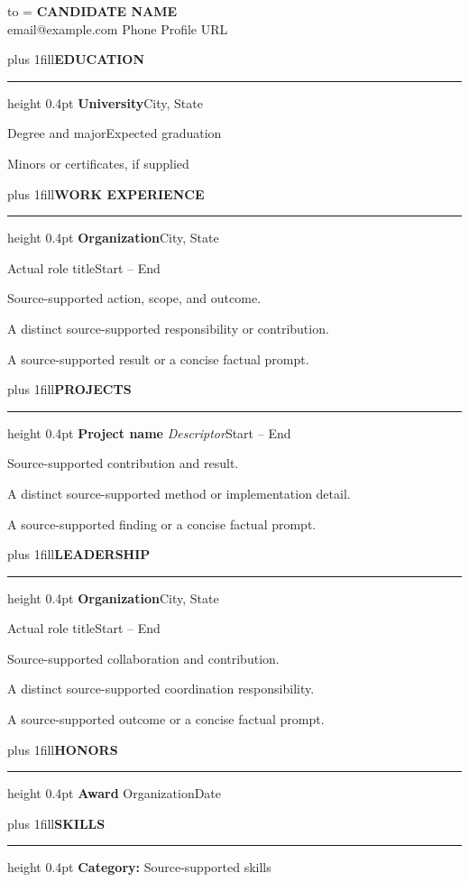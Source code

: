 \documentclass[10pt,letterpaper]{article}
\renewenvironment{itemize}{\begin{list}{\textbullet}{\setlength{\leftmargin}{1.1em}\setlength{\itemsep}{0.5pt}\setlength{\parsep}{0pt}\setlength{\topsep}{2pt}\setlength{\partopsep}{0pt}}}{\end{list}}
\newcommand{\resumeSection}[1]{\par\vskip 4pt plus 1fill\noindent\textbf{\MakeUppercase{#1}}\par\nobreak\vspace{1pt}\hrule height 0.4pt\nobreak\vspace{3pt}}
\newcommand{\resumeEntryGap}{\par\vspace{6pt}}
\newcommand{\resumeRow}[2]{\noindent #1\hfill #2\par}
\begin{document}
\noindent\vbox to \textheight\bgroup
\hsize=\textwidth
\begingroup\centering
{\fontsize{18}{20}\selectfont\bfseries CANDIDATE NAME}\\[2pt]
email@example.com \enspace\textbullet\enspace Phone \enspace\textbullet\enspace Profile URL
\par\endgroup
\vspace{4pt}

\resumeSection{Education}
\resumeRow{\textbf{University}}{City, State}
\resumeRow{Degree and major}{Expected graduation}
Minors or certificates, if supplied

\resumeSection{Work Experience}
\resumeRow{\textbf{Organization}}{City, State}
\resumeRow{\textnormal{Actual role title}}{Start -- End}
\begin{itemize}
\item Source-supported action, scope, and outcome.
\item A distinct source-supported responsibility or contribution.
\item A source-supported result or a concise factual prompt.
\end{itemize}

\resumeSection{Projects}
\resumeRow{\textbf{Project name} \textbar{} \textit{Descriptor}}{Start -- End}
\begin{itemize}
\item Source-supported contribution and result.
\item A distinct source-supported method or implementation detail.
\item A source-supported finding or a concise factual prompt.
\end{itemize}

\resumeSection{Leadership}
\resumeRow{\textbf{Organization}}{City, State}
\resumeRow{\textnormal{Actual role title}}{Start -- End}
\begin{itemize}
\item Source-supported collaboration and contribution.
\item A distinct source-supported coordination responsibility.
\item A source-supported outcome or a concise factual prompt.
\end{itemize}

\resumeSection{Honors}
\resumeRow{\textbf{Award} \textbar{} Organization}{Date}
\resumeSection{Skills}
\textbf{Category:} Source-supported skills

\par\egroup
\end{document}

